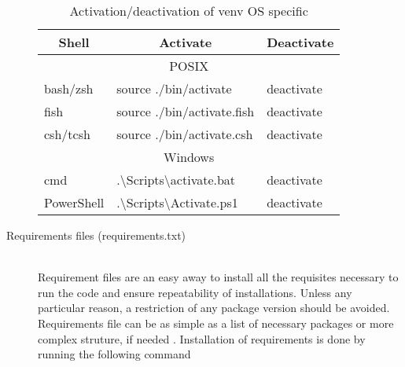 \begin{description}
	\begin{table}[hb]
		\centering
		\begin{tabular}{lll}
			\toprule
			\multicolumn{1}{c}{\textbf{Shell}} & \multicolumn{1}{c}{\textbf{Activate}} & \multicolumn{1}{c}{\textbf{Deactivate}}\\
			\midrule
			\multicolumn{3}{c}{POSIX}\\
			\midrule
			bash/zsh & source ./bin/activate & deactivate\\
			fish & source ./bin/activate.fish & deactivate\\
			csh/tcsh & source ./bin/activate.csh & deactivate\\
			\midrule
			\multicolumn{3}{c}{Windows}\\
			\midrule
			cmd & .\textbackslash Scripts\textbackslash activate.bat & deactivate\\
			PowerShell & .\textbackslash Scripts\textbackslash Activate.ps1 & deactivate\\
			\bottomrule
		\end{tabular}
		\caption{Activation/deactivation of venv OS specific}
		\label{tab:venv_activate}
	\end{table}

	\item[Requirements files (requirements.txt)] \hfill \\Requirement files are an easy away to install all the requisites necessary to run the code and ensure repeatability of installations. Unless any particular reason, a restriction of any package version should be avoided. Requirements file can be as simple as a list of necessary packages or more complex struture, if needed \cite{python_requirements}. Installation of requirements is done by running the following command 
	

\end{description}
